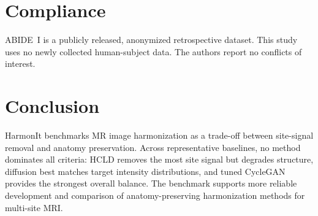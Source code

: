 \documentclass{article}
\begin{document}
\section{Compliance}
ABIDE~I is a publicly released, anonymized retrospective dataset. This study uses no newly collected human-subject data. The authors report no conflicts of interest.

\section{Conclusion}
HarmonIt benchmarks MR image harmonization as a trade-off between site-signal removal and anatomy preservation. Across representative baselines, no method dominates all criteria: HCLD removes the most site signal but degrades structure, diffusion best matches target intensity distributions, and tuned CycleGAN provides the strongest overall balance. The benchmark supports more reliable development and comparison of anatomy-preserving harmonization methods for multi-site MRI.



\end{document}
